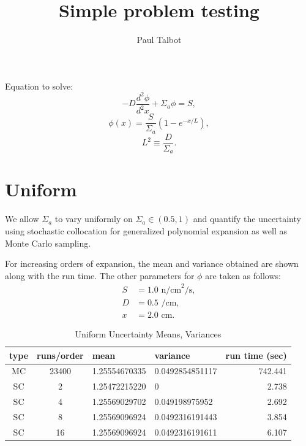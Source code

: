\documentclass[11pt]{article} %
\title{Simple problem testing}
\author{Paul Talbot}
\newcommand{\ddrv}[2]{\ensuremath{\frac{d^2 #1}{d^2 #2}}}
\begin{document}
\maketitle

Equation to solve:
\begin{equation}
-D\ddrv{\phi}{x}+\Sigma_a\phi = S,
\end{equation}
\begin{equation}
\phi(x)=\frac{S}{\Sigma_a}\left(1-e^{-x/L}\right),
\end{equation}
\begin{equation}
L^2\equiv \frac{D}{\Sigma_a}.
\end{equation}

\section{Uniform}
We allow $\Sigma_a$ to vary uniformly on $\Sigma_a\in(0.5,1)$ and quantify the uncertainty using stochastic collocation for generalized polynomial expansion as well as Monte Carlo sampling.

For increasing orders of expansion, the mean and variance obtained are shown along with the run time.  The other parameters for $\phi$ are taken as follows:
\begin{align}
S &= 1.0 \text{ n/cm}^2\text{/s},\\
D &= 0.5 \text{ /cm},\\
x &= 2.0 \text{ cm}.
\end{align}
\begin{table}
\begin{center}
\begin{tabular}{c c|l l| r}
type & runs/order & mean & variance & run time (sec) \\ \hline
MC & 23400 & 1.25554670335 & 0.0492854851117 & 742.441\\
SC & 2 & 1.25472215220 & 0 & 2.738\\
SC & 4 & 1.25569029702 & 0.049198975952 & 2.692\\
SC & 8 & 1.25569096924 & 0.0492316191443 & 3.854\\
SC & 16 & 1.25569096924 & 0.0492316191611 & 6.107
\end{tabular}
\end{center}
\caption{Uniform Uncertainty Means, Variances}
\end{table}
\end{document}
